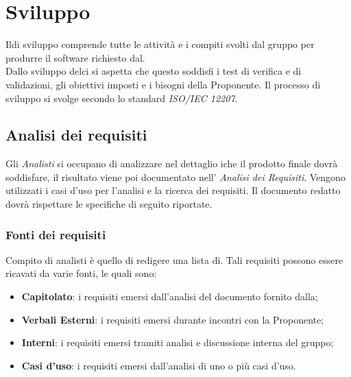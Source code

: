 
\section{Sviluppo}
Ildi sviluppo comprende tutte le attività e i compiti svolti dal gruppo per produrre il software richiesto dal.\\ Dallo sviluppo delci si aspetta che questo soddisfi i test di verifica e di validazioni, gli obiettivi imposti e i bisogni della Proponente. Il processo di sviluppo si svolge secondo lo standard \textit{ISO/IEC 12207}.
\subsection{Analisi dei requisiti}
Gli \textit{Analisti} si occupano di analizzare nel dettaglio iche il prodotto finale dovrà soddisfare, il risultato viene poi documentato nell' \textit{Analisi dei Requisiti}. Vengono utilizzati i casi d'uso per l'analisi e la ricerca dei requisiti.
Il documento redatto dovrà rispettare le specifiche di seguito riportate.
\subsubsection{Fonti dei requisiti}
Compito di analisti è quello di redigere una lista di. Tali requisiti possono essere ricavati da varie fonti, le quali sono:
\begin{itemize}
	\item \textbf{Capitolato}: i requisiti emersi dall'analisi del documento fornito dalla;
	\item \textbf{Verbali Esterni}: i requisiti emersi durante incontri con la Proponente;
	\item \textbf{Interni}: i requisiti emersi tramiti analisi e discussione interna del gruppo;
	\item \textbf{Casi d'uso}: i requisiti emersi dall'analisi di uno o più casi d'uso.
\end{itemize}
